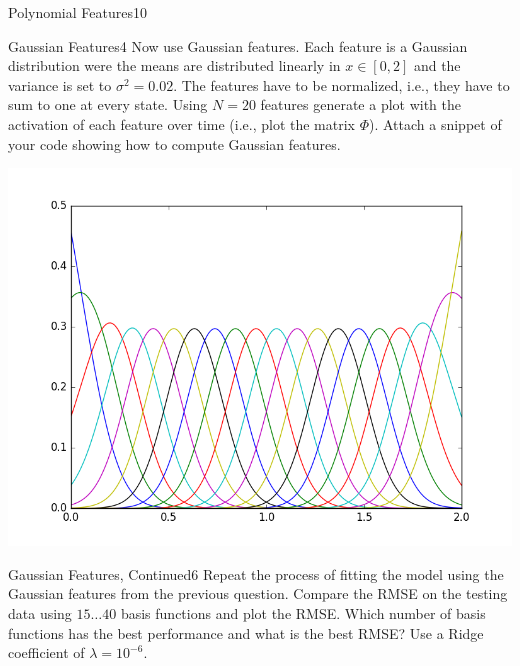 \begin{questions}
\begin{question}{Polynomial Features}{10}
\begin{answer}
	
\end{answer}

\end{question}


\begin{question}{Gaussian Features}{4}
Now use Gaussian features. Each feature is a Gaussian distribution were the means are distributed linearly in $x \in[0,2]$ and the variance is set to $\sigma^2=0.02$. The features have to be normalized, i.e., they have to sum to one at every state. Using $N=20$ features generate a plot with the activation of each feature over time (i.e., plot the matrix $\Phi$). Attach a snippet of your code showing how to compute Gaussian features.

\begin{answer}
\centering \includegraphics[width=1.0\linewidth]{img/31b}\label{fig:gaussians}



\end{answer}

\end{question}


\begin{question}{Gaussian Features, Continued}{6}
Repeat the process of fitting the model using the Gaussian features from the previous question. Compare the RMSE on the testing data using $15 \ldots 40$ basis functions and plot the RMSE. Which number of basis functions has the best performance and what is the best RMSE? Use a Ridge coefficient of $\lambda=10^{-6}$.


\end{question}
\end{questions}
